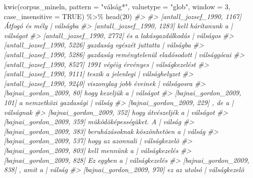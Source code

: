 \documentclass[
]{book}
\newenvironment{Shaded}{\begin{snugshade}}{\end{snugshade}}
\newcommand{\AttributeTok}[1]{\textcolor[rgb]{0.77,0.63,0.00}{#1}}
\newcommand{\CommentTok}[1]{\textcolor[rgb]{0.56,0.35,0.01}{\textit{#1}}}
\newcommand{\ConstantTok}[1]{\textcolor[rgb]{0.00,0.00,0.00}{#1}}
\newcommand{\DecValTok}[1]{\textcolor[rgb]{0.00,0.00,0.81}{#1}}
\newcommand{\FunctionTok}[1]{\textcolor[rgb]{0.00,0.00,0.00}{#1}}
\newcommand{\NormalTok}[1]{#1}
\newcommand{\SpecialCharTok}[1]{\textcolor[rgb]{0.00,0.00,0.00}{#1}}
\newcommand{\StringTok}[1]{\textcolor[rgb]{0.31,0.60,0.02}{#1}}
\begin{document}
\begin{Shaded}
\begin{Highlighting}[]
\FunctionTok{kwic}\NormalTok{(corpus\_mineln, }\AttributeTok{pattern =} \StringTok{"válság*"}\NormalTok{, }\AttributeTok{valuetype =} \StringTok{"glob"}\NormalTok{, }\AttributeTok{window =} \DecValTok{3}\NormalTok{, }\AttributeTok{case\_insensitive =} \ConstantTok{TRUE}\NormalTok{) }\SpecialCharTok{\%\textgreater{}\%}
  \FunctionTok{head}\NormalTok{(}\DecValTok{20}\NormalTok{)}
\CommentTok{\#\textgreater{}                                                                                }
\CommentTok{\#\textgreater{}  [antall\_jozsef\_1990, 1167]                     Átfogó és mély |    válságba   }
\CommentTok{\#\textgreater{}  [antall\_jozsef\_1990, 1283]                  kell hárítanunk a |    válságot   }
\CommentTok{\#\textgreater{}  [antall\_jozsef\_1990, 2772]              és a lakásgazdálkodás |    válságos   }
\CommentTok{\#\textgreater{}  [antall\_jozsef\_1990, 5226]          gazdaság egészét juttatta |    válságba   }
\CommentTok{\#\textgreater{}  [antall\_jozsef\_1990, 5286] gazdaság reménytelenül eladósodott |  válsággócai  }
\CommentTok{\#\textgreater{}  [antall\_jozsef\_1990, 8527]               1991 végéig érvényes | válságkezelést}
\CommentTok{\#\textgreater{}  [antall\_jozsef\_1990, 9111]                 teszik a jelenlegi | válsághelyzet }
\CommentTok{\#\textgreater{}  [antall\_jozsef\_1990, 9240]            viszonylag jobb éveinek |   válságosra  }
\CommentTok{\#\textgreater{}    [bajnai\_gordon\_2009, 80]                    hogy kezeljük a |    válságot   }
\CommentTok{\#\textgreater{}   [bajnai\_gordon\_2009, 101]             a nemzetközi gazdasági |     válság    }
\CommentTok{\#\textgreater{}   [bajnai\_gordon\_2009, 229]                             , de a |   válságnak   }
\CommentTok{\#\textgreater{}   [bajnai\_gordon\_2009, 352]                 hogy átvészeljék a |    válságot   }
\CommentTok{\#\textgreater{}   [bajnai\_gordon\_2009, 359]              mûködõképességüket. A |     válság    }
\CommentTok{\#\textgreater{}   [bajnai\_gordon\_2009, 383]      beruházásoknak köszönhetõen a |     válság    }
\CommentTok{\#\textgreater{}   [bajnai\_gordon\_2009, 537]                   hogy az azonnali |  válságkezelõ }
\CommentTok{\#\textgreater{}   [bajnai\_gordon\_2009, 803]                     kell mennünk a | válságkezelés }
\CommentTok{\#\textgreater{}   [bajnai\_gordon\_2009, 828]                        Ez egyben a | válságkezelés }
\CommentTok{\#\textgreater{}   [bajnai\_gordon\_2009, 838]                           , amit a |     válság    }
\CommentTok{\#\textgreater{}   [bajnai\_gordon\_2009, 970]                       ez az utolsó |  válságkezelõ }

\end{Highlighting}
\end{Shaded}
\end{document}
